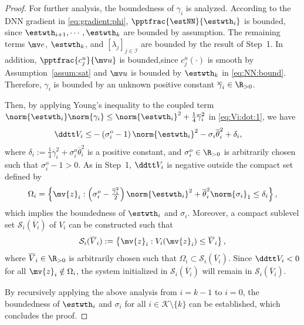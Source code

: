 \documentclass[letterpaper, journal, twoside]{IEEEtran}
\begin{document}
\begin{proof}
For further analysis, the boundedness of $\gamma_i$ is analyzed.
According to the DNN gradient in \eqref{eq:gradient:phi}, $\pptfrac{\estNN}{\estwth_i}$ is bounded, since $\estwth_{i+1},\cdots,\estwth_k$ are bounded by assumption.
The remaining terms $\mv e$, $\estwth_k$, and $[\lambda_j]_{j\in\mathcal I}$ are bounded by the result of Step~1.
In addition, $\pptfrac{c_j^u}{\mv u}$ is bounded,since $c_j^u(\cdot)$ is smooth by Assumption~\ref{assum:sat} and $\mv u$ is bounded by $\estwth_k$ in \eqref{eq:NN:bound}.
Therefore, $\gamma_i$ is bounded by an unknown positive constant $\overline{\gamma}_i\in\R_{>0}$.

Then, by applying Young's inequality to the coupled term $\norm{\estwth_i}\norm{\gamma_i}\le\norm{\estwth_i}^2+\tfrac{1}{4}\overline{\gamma}_i^2$ in \eqref{eq:Vi:dot:1}, we have
\begin{align} \label{eq:Vi:dot:2}
  \ddtt V_i
  \le&
    -
    \left(
      \sigma_i^o
      -
      1
    \right)
    \norm{\estwth_i}^2
    -
    \sigma_i \overline{\theta}_i^2
    +
    \delta_i
  ,
\end{align}
where $\delta_i:=\frac{1}{4}\overline{\gamma}_i^2 + \sigma_i^o \overline{\theta}_i^2$ is a positive constant, and $\sigma_i^o\in\R_{>0}$ is arbitrarily chosen such that $\sigma_i^o - 1 > 0$.
As in Step~1, $\ddtt V_i$ is negative outside the compact set defined by 
\begin{equation}
  \Omega_i
  =
  \left\{
    \mv{z}_i
    :
    \left(
      \sigma_i^o
      -
      \tfrac{\overline{\gamma}_i^2}{2}
    \right)
    \norm{\estwth_i}^2
    +
    \overline{\theta}_i^2
    \norm{\sigma_i}_1
    \le
    \delta_i
  \right\}
  , 
\end{equation}
which implies the boundedness of $\estwth_i$ and $\sigma_i$.
Moreover, a compact sublevel set $\mathcal{S}_i(\overline{V}_i)$ of $V_i$ can be constructed such that 
\begin{equation} \label{eq:Si:def}
  \mathcal{S}_i(\overline{V}_i)
  :=
  \left\{
    \mv{z}_i
    :
    V_i(\mv{z}_i)
    \le
    \overline{V}_i
  \right\}
  ,
\end{equation}
where $\overline{V}_i\in\R_{>0}$ is arbitrarily chosen such that $\Omega_i \subset \mathcal{S}_i(\overline{V}_i)$.
Since $\ddtt V_i<0$ for all $\mv{z}_i\notin\Omega_i$, the system initialized in $\mathcal{S}_i(\overline{V}_i)$ will remain in $\mathcal{S}_i(\overline{V}_i)$.

By recursively applying the above analysis from $i=k-1$ to $i=0$, the boundedness of $\estwth_i$ and $\sigma_i$ for all $i\in\mathcal{K}\setminus\{k\}$ can be established, which concludes the proof.

\end{proof}
\end{document}
